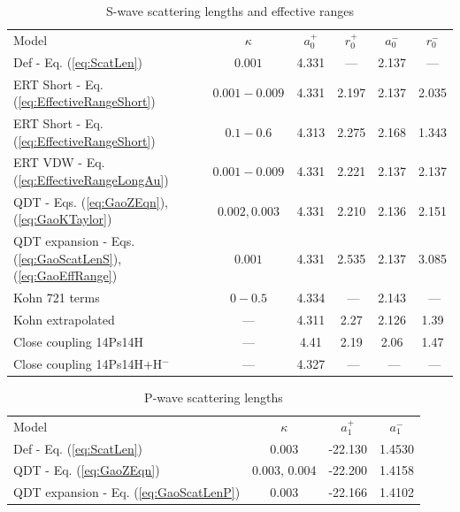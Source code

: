 \documentclass[preprint,showpacs,preprintnumbers,amsmath,amssymb]{revtex4}
\begin{document}
\begin{table}[H]
\begin{center}
\begin{ruledtabular}
\begin{tabular}{l c c c c c}
Model & $\kappa$ & $a_0^+$ & $r_0^+$ & $a_0^-$ & $r_0^-$ \\
\colrule
Def - Eq. (\ref{eq:ScatLen}) & $0.001$ & 4.331 & --- & 2.137 & --- \\
ERT Short - Eq. (\ref{eq:EffectiveRangeShort}) & $0.001 - 0.009$ & 4.331 & 2.197 & 2.137 & 2.035 \\
ERT Short - Eq. (\ref{eq:EffectiveRangeShort}) & $0.1 - 0.6$ & 4.313 & 2.275 & 2.168 & 1.343 \\
ERT VDW - Eq. (\ref{eq:EffectiveRangeLongAu}) & $0.001 - 0.009$ & 4.331 & 2.221 & 2.137 & 2.137 \\
QDT - Eqs. (\ref{eq:GaoZEqn}), (\ref{eq:GaoKTaylor}) & $0.002, 0.003$ & 4.331 & 2.210 & 2.136 & 2.151 \\
QDT expansion - Eqs. (\ref{eq:GaoScatLenS}), (\ref{eq:GaoEffRange}) & $0.001$ & 4.331 & 2.535 & 2.137 & 3.085 \\
\colrule
Kohn 721 terms \cite{VanReeth2003} & $0 - 0.5$ & 4.334 & \,\,--- & 2.143 & \,\,--- \\
Kohn extrapolated \cite{VanReeth2003} & --- & 4.311 & 2.27 & 2.126 & 1.39 \\
Close coupling 14Ps14H \cite{Blackwood2002} & --- & 4.41 & 2.19 & 2.06 & 1.47 \\
Close coupling 14Ps14H+H$^-$ \cite{Walters2004} & --- & 4.327 & \,\,--- & \,\,--- & \,\,--- \\
\end{tabular}
\end{ruledtabular}
\caption{S-wave scattering lengths and effective ranges}
\label{tab:SWaveScatLenERT}
\end{center}
\end{table}




\begin{table}[H]
\begin{center}
\begin{ruledtabular}
\begin{tabular}{l c c c}
Model & $\kappa$ & $a_1^+$ & $a_1^-$ \\
\colrule
Def - Eq. (\ref{eq:ScatLen}) & 0.003 & -22.130 & 1.4530 \\
QDT - Eq. (\ref{eq:GaoZEqn}) & 0.003, 0.004 & -22.200 & 1.4158 \\
QDT expansion - Eq. (\ref{eq:GaoScatLenP}) & 0.003 & -22.166 & 1.4102 \\
\end{tabular}
\end{ruledtabular}
\caption{P-wave scattering lengths}
\label{tab:PWaveScatLen}
\end{center}
\end{table}
\end{document}
